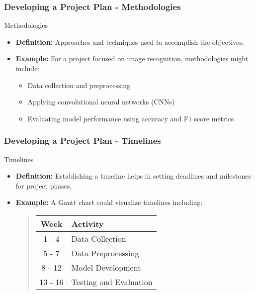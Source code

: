 \documentclass[aspectratio=169]{beamer}
\begin{document}
\begin{frame}[fragile]
    \frametitle{Developing a Project Plan - Methodologies}
    \begin{block}{Methodologies}
        \begin{itemize}
            \item \textbf{Definition:} Approaches and techniques used to accomplish the objectives.
            \item \textbf{Example:} For a project focused on image recognition, methodologies might include:
            \begin{itemize}
                \item Data collection and preprocessing
                \item Applying convolutional neural networks (CNNs)
                \item Evaluating model performance using accuracy and F1 score metrics
            \end{itemize}
        \end{itemize}
    \end{block}
\end{frame}

\begin{frame}[fragile]
    \frametitle{Developing a Project Plan - Timelines}
    \begin{block}{Timelines}
        \begin{itemize}
            \item \textbf{Definition:} Establishing a timeline helps in setting deadlines and milestones for project phases.
            \item \textbf{Example:} A Gantt chart could visualize timelines including:
            \begin{quote}
                \begin{tabular}{|c|l|}
                    \hline
                    \textbf{Week} & \textbf{Activity} \\
                    \hline
                    1 - 4 & Data Collection \\
                    5 - 7 & Data Preprocessing \\
                    8 - 12 & Model Development \\
                    13 - 16 & Testing and Evaluation \\
                    \hline
                \end{tabular}
            \end{quote}
        \end{itemize}
    \end{block}
\end{frame}
\end{document}
